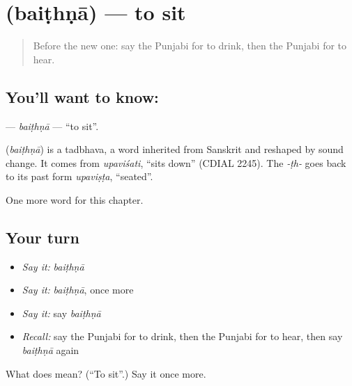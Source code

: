 \section[\texorpdfstring{\pa{ਬੈਠਣਾ} (baiṭhṇā)}{ਬੈਠਣਾ (baiṭhṇā)}]{ (baiṭhṇā) — to sit}

\label{lesson:PA-C56-baithna}



\begin{quote}
Before the new one: say the Punjabi for to drink, then the Punjabi for to hear.
\end{quote}

\subsection*{You'll want to know: }
\textbf{} — \emph{baiṭhṇā} — \textquotedblleft{}to sit\textquotedblright{}.

\begin{cousinweb}
\textbf{} (\emph{baiṭhṇā}) is a tadbhava, a word inherited from Sanskrit and reshaped by sound change. It comes from \emph{upaviśati}, \textquotedblleft{}sits down\textquotedblright{} (CDIAL 2245). The \emph{-ṭh-} goes back to its past form \emph{upaviṣṭa}, \textquotedblleft{}seated\textquotedblright{}.
\end{cousinweb}

\begin{grammarlens}[title={What you've built}]
One more word for this chapter.
\end{grammarlens}

\subsection*{Your turn}
\begin{itemize}
\raggedright
  \item \emph{Say it:} \emph{baiṭhṇā}
  \item \emph{Say it:} \emph{baiṭhṇā}, once more
  \item \emph{Say it:} say \emph{baiṭhṇā}
  \item \emph{Recall:} say the Punjabi for to drink, then the Punjabi for to hear, then say \emph{baiṭhṇā} again
\end{itemize}

\begin{tcolorbox}[breakable,colback=teal!4,colframe=teal!35!black,title={Before you move on}]
What does  mean? (\textquotedblleft{}To sit\textquotedblright{}.) Say it once more.
\end{tcolorbox}
